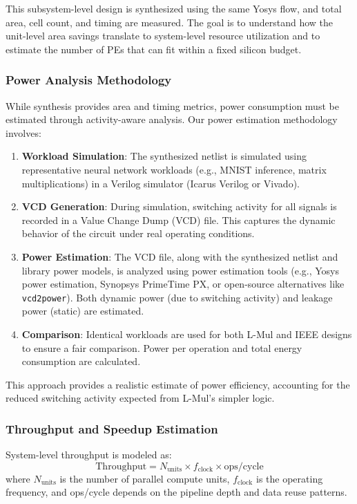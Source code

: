 \documentclass[12pt,letterpaper]{article}
\begin{document}
This subsystem-level design is synthesized using the same Yosys flow, and total area, cell count, and timing are measured. The goal is to understand how the unit-level area savings translate to system-level resource utilization and to estimate the number of PEs that can fit within a fixed silicon budget.

\subsubsection{Power Analysis Methodology}
While synthesis provides area and timing metrics, power consumption must be estimated through activity-aware analysis. Our power estimation methodology involves:
\begin{enumerate}
    \item \textbf{Workload Simulation}: The synthesized netlist is simulated using representative neural network workloads (e.g., MNIST inference, matrix multiplications) in a Verilog simulator (Icarus Verilog or Vivado).
    \item \textbf{VCD Generation}: During simulation, switching activity for all signals is recorded in a Value Change Dump (VCD) file. This captures the dynamic behavior of the circuit under real operating conditions.
    \item \textbf{Power Estimation}: The VCD file, along with the synthesized netlist and library power models, is analyzed using power estimation tools (e.g., Yosys power estimation, Synopsys PrimeTime PX, or open-source alternatives like \texttt{vcd2power}). Both dynamic power (due to switching activity) and leakage power (static) are estimated.
    \item \textbf{Comparison}: Identical workloads are used for both L-Mul and IEEE designs to ensure a fair comparison. Power per operation and total energy consumption are calculated.
\end{enumerate}

This approach provides a realistic estimate of power efficiency, accounting for the reduced switching activity expected from L-Mul's simpler logic.

\subsubsection{Throughput and Speedup Estimation}
System-level throughput is modeled as:
\[
\text{Throughput} = N_{\text{units}} \times f_{\text{clock}} \times \text{ops/cycle}
\]
where $N_{\text{units}}$ is the number of parallel compute units, $f_{\text{clock}}$ is the operating frequency, and ops/cycle depends on the pipeline depth and data reuse patterns.
\end{document}
